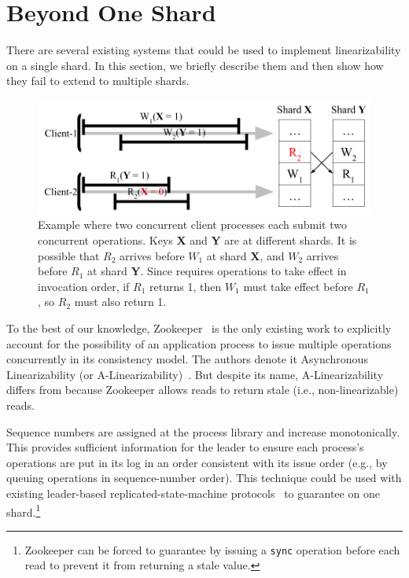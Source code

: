 \section{\MDL{} Beyond One Shard}
\label{sec:mdl:zookeeper}

There are several existing systems that could be used to implement
\multidispatch{} linearizability on a single shard. In this section,
we briefly describe them and then show how they fail to extend to
multiple shards.

\begin{figure}[!tb]
    \includegraphics[scale=.45]{figs/somet.png}
    \caption{Example where two concurrent client processes each submit two concurrent operations. Keys \textbf{X} and \textbf{Y} are at different shards. It is possible that $R_2$ arrives before $W_1$ at shard \textbf{X}, and $W_2$ arrives before $R_1$ at shard \textbf{Y}. Since \MDL{} requires operations to take effect in invocation order, if $R_1$ returns 1, then $W_1$ must take effect before $R_1$, so $R_2$ must also return 1.}
    \label{fig:concurrentbatches}
\end{figure}

To the best of our knowledge, Zookeeper~\cite{hunt2010zookeeper} is the
only existing work to explicitly account for the possibility of an 
application process to issue multiple operations concurrently in its
consistency model. The authors denote it Asynchronous Linearizability
(or A-Linearizability)~\cite{hunt2010zookeeper}. But despite its name,
A-Linearizability differs from \MDL{} because Zookeeper allows
reads to return stale (i.e., non-linearizable) reads.

 Sequence numbers are assigned at the process 
library and increase monotonically. This provides sufficient information for
the leader to ensure each process's operations are put in its log in an
order consistent with its issue order
(e.g., by queuing operations in sequence-number order).
This technique could be used with existing leader-based replicated-state-machine
protocols~\cite{ongaro2014raft,lamport1998paxos,oki1988vr} to guarantee
\MDL{} on one shard.\footnote{Zookeeper can be forced to
guarantee \MDL{} by issuing a \texttt{sync} operation before each read to prevent it from returning a stale value.}

